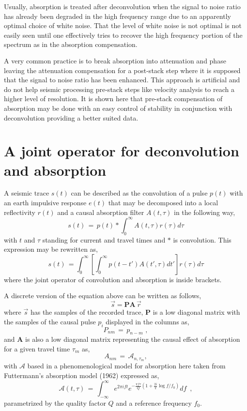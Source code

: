 \documentclass[twoside,letterpaper,twocolumn]{article}
\begin{document}
Usually, absorption is treated after deconvolution when the signal to noise ratio has already
been degraded in the high frequency range due to an apparently optimal choice of white noise. That the level
of white noise is not optimal is not easily seen until one effectively tries to recover the high 
frequency portion of the spectrum as in the absorption compensation.

A very common practice is to break absorption into attenuation and phase leaving the attenuation compensation
for a post-stack step where it is supposed that the signal to noise ratio has been enhanced. This approach is 
artificial and do not help seismic processing pre-stack steps like velocity analysis to reach a higher
level of resolution. It is shown here that pre-stack compensation of absorption may be done with an easy control
of stability in conjunction with deconvolution providing a better suited data. 


\section{A joint operator for deconvolution and absorption}

A seismic trace $s(t)$ can be described as the convolution of a pulse $p(t)$ with an earth
impulsive response $e(t)$ that may be decomposed into a local reflectivity $r(t)$ and 
a causal absorption filter $A(t,\tau)$ in the following way, 
\begin{equation}
 s(t)\,=\,p(t)\ast \int_0^{\infty}A(t,\tau)r(\tau)d\tau
\end{equation}
with $t$ and $\tau$ standing for current and travel times and
$\ast$ is convolution. This expression may be rewritten as,
\begin{equation}
 s(t)\,=\int_0^{\infty}\left[ \int_0^{\infty}p(t-t')A(t',\tau)dt'\right] r(\tau)d\tau
\end{equation}
where the joint operator of convolution and absorption is inside brackets.

A discrete version of the equation above can be written as follows,
\begin{equation}
 \vec s = \mathbf{P}\mathbf{A}\, \vec r
\end{equation}
where $\vec s$ has the samples of the recorded trace, $\mathbf{P}$ is a low diagonal matrix with the
samples of the causal pulse $p_i$ displayed in the columns as,
\begin{equation}
 P_{nm}\,=\,p_{n-m}\,\, ,
\end{equation}
and $\mathbf{A}$ is also a low diagonal matrix representing the causal effect 
of absorption for a given travel time $\tau_m$ as,
\begin{equation}
 A_{nm}\,=\,\mathcal{A}_{n,\tau_m},
\end{equation}
with $\mathcal{A}$ based in a phenomenological model for absorption here taken 
from Futtermann's absorption model (1962) expressed as,
\begin{equation}
 \mathcal{A}(t,\tau)\,=\,\int_{-\infty}^{\infty}e^{2\pi i ft}e^{-\frac{\pi f\tau}{Q}\left(1 + \frac{2i}{\pi}
\log{f/f_0}\right)}df \,\,\, ,
\end{equation}
parametrized by the quality factor $Q$ and a reference frequency $f_0$.
\end{document}
